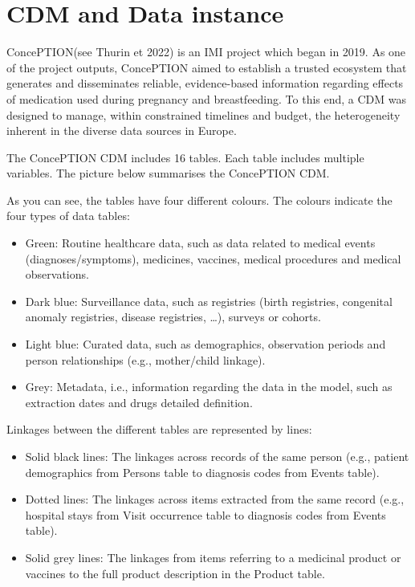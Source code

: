 \documentclass[
  letterpaper,
  DIV=11,
  numbers=noendperiod]{scrreprt}
\providecommand{\tightlist}{%
  \setlength{\itemsep}{0pt}\setlength{\parskip}{0pt}}\usepackage{longtable,booktabs,array}
\begin{document}
\hypertarget{cdm-and-data-instance}{%
\chapter{CDM and Data instance}\label{cdm-and-data-instance}}

ConcePTION(see Thurin et 2022) is an IMI project which began in 2019. As
one of the project outputs, ConcePTION aimed to establish a trusted
ecosystem that generates and disseminates reliable, evidence-based
information regarding effects of medication used during pregnancy and
breastfeeding. To this end, a CDM was designed to manage, within
constrained timelines and budget, the heterogeneity inherent in the
diverse data sources in Europe.

The ConcePTION CDM includes 16 tables. Each table includes multiple
variables. The picture below summarises the ConcePTION CDM.

As you can see, the tables have four different colours. The colours
indicate the four types of data tables:

\begin{itemize}
\tightlist
\item
  Green: Routine healthcare data, such as data related to medical events
  (diagnoses/symptoms), medicines, vaccines, medical procedures and
  medical observations.
\item
  Dark blue: Surveillance data, such as registries (birth registries,
  congenital anomaly registries, disease registries, \ldots), surveys or
  cohorts.
\item
  Light blue: Curated data, such as demographics, observation periods
  and person relationships (e.g., mother/child linkage).
\item
  Grey: Metadata, i.e., information regarding the data in the model,
  such as extraction dates and drugs detailed definition.
\end{itemize}

Linkages between the different tables are represented by lines:

\begin{itemize}
\tightlist
\item
  Solid black lines: The linkages across records of the same person
  (e.g., patient demographics from Persons table to diagnosis codes from
  Events table).
\item
  Dotted lines: The linkages across items extracted from the same record
  (e.g., hospital stays from Visit occurrence table to diagnosis codes
  from Events table).
\item
  Solid grey lines: The linkages from items referring to a medicinal
  product or vaccines to the full product description in the Product
  table.
\end{itemize}
\end{document}
